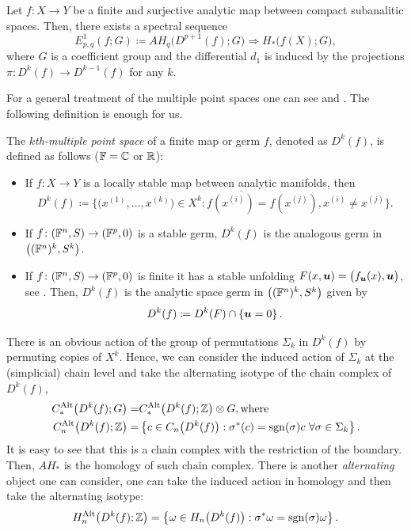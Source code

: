 \documentclass[a4paper,12pt]{amsart}
\begin{document}
\begin{theorem}\label{thm: general icss}
Let $f:X\to Y$ be a finite and surjective analytic map between compact subanalitic spaces. Then, there exists a spectral sequence
$$ E^1_{p,q}(f;G)\coloneqq AH_q\big(D^{p+1}(f);G\big)\Longrightarrow H_*\big(f(X);G\big), $$ 
where $G$ is a coefficient group and the differential $d_1$ is induced by the projections $\pi:D^k(f)\to D^{k-1}(f)$ for any $k$.
\end{theorem}

For a general treatment of the multiple point spaces one can see \cite{Houston2007,Houston1999} and \cite[Chapter 2]{Robertothesis}. The following definition is enough for us.

\begin{definition} \label{def: mult spaces f}
The \emph{$k$th-multiple point space} of a finite map or germ $f$, denoted as $D^k(f)$, is defined as follows ($\mathbb{F}=\mathbb{C}$ or $\mathbb{R}$):
\begin{itemize}
\item
 If $f\colon X\rightarrow Y$ is a locally stable map between analytic manifolds, then
\[D^k(f)\coloneqq\overline{\big\{    \big(x^{(1)},\dots,x^{(k)}\big)\in X^k   :   f\left(x^{(i)}\right)=f\left(x^{(j)}\right), x^{(i)}\neq x^{(j)}  \big\}}.\]

\item If $f\colon (\mathbb{F}^n,S)\rightarrow(\mathbb{F}^p,0)$ is a stable germ, $D^k(f)$ is the analogous germ in $\big((\mathbb{F}^n)^k,S^k\big)$.

\item
If $f\colon(\mathbb{F}^n,S)\rightarrow(\mathbb{F}^p,0)$ is finite it has a stable unfolding $F(x,\bm{u})=\big(f_{\bm{u}}(x),\bm{u}\big)$, see \cite[Proposition 7.2]{Mond2020}. Then, $D^k(f)$ is the analytic space germ in $\big((\mathbb{F}^n)^k,S^k\big)$ given by 
\[ D^k(f)\coloneqq D^k(F)\cap\left\{\bm{u}=0\right\}.\]
\end{itemize}
\end{definition}

There is an obvious action of the group of permutations $\Sigma_k$ in $D^k(f)$ by permuting copies of $X^k$. Hence, we can consider the induced action of $\Sigma_k$ at the (simplicial) chain level and take the alternating isotype of the chain complex of $D^k(f)$, 
\[\begin{aligned}
C^\Alt_*\big(D^k(f);G\big)=& C^\Alt_*\big(D^k(f);\ZZ\big)\otimes G, \text{where}\\
C^\Alt_n\big(D^k(f);\ZZ\big)=& \left\{c\in C_n\big(D^k(f)\big):\sigma^*(c)=\sgn(\sigma)c\ \forall\sigma\in\Sigma_k\right\}.
\end{aligned}\]
It is easy to see that this is a chain complex with the restriction of the boundary. Then, $AH_*$ is the homology of such chain complex. %
There is another \textsl{alternating} object one can consider, one can take the induced action in homology and then take the alternating isotype:
\[ H^{\textnormal{Alt}}_n \big(D^k(f); \mathbb{Z}\big)=\left\{\omega\in H_n\big(D^k(f)\big) : \sigma ^* \omega = \operatorname{sgn}(\sigma) \omega\right\}.\]
\end{document}
